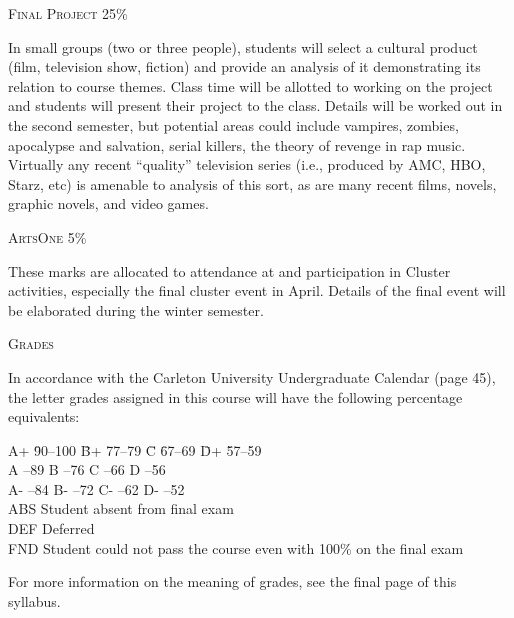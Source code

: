 \documentclass[12pt]{article}
\begin{document}
{\large \textsc{Final Project 25\%}}

In small groups (two or three people), students will select a cultural product (film, television show, fiction) and provide an analysis of it demonstrating its relation to course themes. Class time will be allotted to working on the project and students will present their project to the class. Details will be worked out in the second semester, but potential areas could include vampires, zombies, apocalypse and salvation, serial killers, the theory of revenge in rap music. Virtually any recent ``quality'' television series (i.e., produced by AMC, HBO, Starz, etc) is amenable to analysis of this sort, as are many recent films, novels, graphic novels, and video games.

\vspace{.125in}

{\large \textsc{ArtsOne 5\%}}

These marks are allocated to attendance at and participation in Cluster activities, especially the final cluster event in April. Details of the final event will be elaborated during the winter semester.

{\large \textsc{Grades}}

In accordance with the Carleton University Undergraduate Calendar (page 45), the letter grades assigned in this course will have the following percentage equivalents:

\begin{tabbing}
A+ \hspace{.125in} \= 90--100 \hspace{.25in} \= B+ \hspace{.125in} \= 77--79 \hspace{.25in} \= C \hspace{.125in} \= 67--69 \hspace{.25in} \= D+ \hspace{.125in} \= 57--59 \\
A --89 \> B --76 \> C --66 \> D --56 \\
A- --84 \> B- --72 \> C- --62 \> D- --52 \\
ABS \> Student absent from final exam \\
DEF \> Deferred \\
FND \> Student could not pass the course even with 100\% on the final exam
\end{tabbing}

For more information on the meaning of grades, see the final page of this syllabus.
\end{document}
